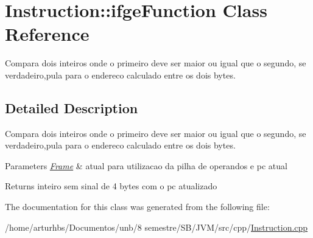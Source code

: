 \hypertarget{classInstruction_1_1ifgeFunction}{}\section{Instruction\+:\+:ifge\+Function Class Reference}
\label{classInstruction_1_1ifgeFunction}


Compara dois inteiros onde o primeiro deve ser maior ou igual que o segundo, se verdadeiro,pula para o endereco calculado entre os dois bytes.  




\subsection{Detailed Description}
Compara dois inteiros onde o primeiro deve ser maior ou igual que o segundo, se verdadeiro,pula para o endereco calculado entre os dois bytes. 


\begin{DoxyParams}{Parameters}
{\em \hyperlink{classFrame}{Frame}} & atual para utilizacao da pilha de operandos e pc atual \\
\hline
\end{DoxyParams}
\begin{DoxyReturn}{Returns}
inteiro sem sinal de 4 bytes com o pc atualizado 
\end{DoxyReturn}


The documentation for this class was generated from the following file\+:\begin{DoxyCompactItemize}
\item 
/home/arturhbs/\+Documentos/unb/8 semestre/\+S\+B/\+J\+V\+M/src/cpp/\hyperlink{Instruction_8cpp}{Instruction.\+cpp}\end{DoxyCompactItemize}
